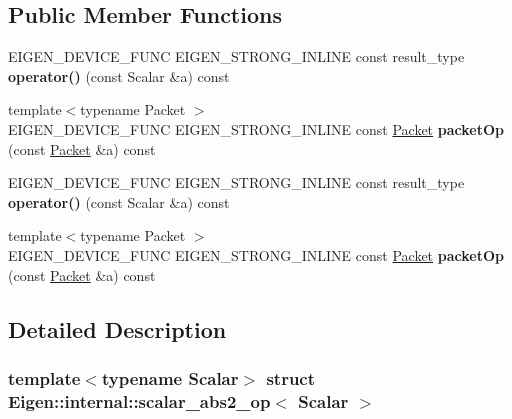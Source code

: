 \subsection*{Public Member Functions}
\begin{DoxyCompactItemize}
\item 
\mbox{\label{struct_eigen_1_1internal_1_1scalar__abs2__op_a7f0176339ccb73b9ea97a8871237f5c6}} 
E\+I\+G\+E\+N\+\_\+\+D\+E\+V\+I\+C\+E\+\_\+\+F\+U\+NC E\+I\+G\+E\+N\+\_\+\+S\+T\+R\+O\+N\+G\+\_\+\+I\+N\+L\+I\+NE const result\+\_\+type {\bfseries operator()} (const Scalar \&a) const
\item 
\mbox{\label{struct_eigen_1_1internal_1_1scalar__abs2__op_aa33487affb7a7b6395ba0c475c0e548e}} 
{\footnotesize template$<$typename Packet $>$ }\\E\+I\+G\+E\+N\+\_\+\+D\+E\+V\+I\+C\+E\+\_\+\+F\+U\+NC E\+I\+G\+E\+N\+\_\+\+S\+T\+R\+O\+N\+G\+\_\+\+I\+N\+L\+I\+NE const \hyperlink{union_eigen_1_1internal_1_1_packet}{Packet} {\bfseries packet\+Op} (const \hyperlink{union_eigen_1_1internal_1_1_packet}{Packet} \&a) const
\item 
\mbox{\label{struct_eigen_1_1internal_1_1scalar__abs2__op_a7f0176339ccb73b9ea97a8871237f5c6}} 
E\+I\+G\+E\+N\+\_\+\+D\+E\+V\+I\+C\+E\+\_\+\+F\+U\+NC E\+I\+G\+E\+N\+\_\+\+S\+T\+R\+O\+N\+G\+\_\+\+I\+N\+L\+I\+NE const result\+\_\+type {\bfseries operator()} (const Scalar \&a) const
\item 
\mbox{\label{struct_eigen_1_1internal_1_1scalar__abs2__op_aa33487affb7a7b6395ba0c475c0e548e}} 
{\footnotesize template$<$typename Packet $>$ }\\E\+I\+G\+E\+N\+\_\+\+D\+E\+V\+I\+C\+E\+\_\+\+F\+U\+NC E\+I\+G\+E\+N\+\_\+\+S\+T\+R\+O\+N\+G\+\_\+\+I\+N\+L\+I\+NE const \hyperlink{union_eigen_1_1internal_1_1_packet}{Packet} {\bfseries packet\+Op} (const \hyperlink{union_eigen_1_1internal_1_1_packet}{Packet} \&a) const
\end{DoxyCompactItemize}


\subsection{Detailed Description}
\subsubsection*{template$<$typename Scalar$>$\newline
struct Eigen\+::internal\+::scalar\+\_\+abs2\+\_\+op$<$ Scalar $>$}



